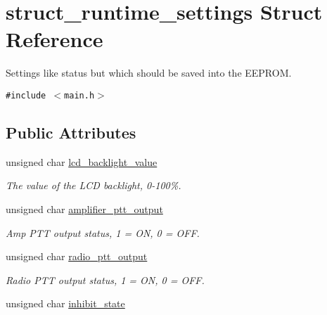 \hypertarget{structstruct__runtime__settings}{
\section{struct\_\-runtime\_\-settings Struct Reference}
\label{structstruct__runtime__settings}
}
Settings like status but which should be saved into the EEPROM.  


{\tt \#include $<$main.h$>$}

\subsection*{Public Attributes}
\begin{CompactItemize}
\item 
\hypertarget{structstruct__runtime__settings_502358dd4cc0cdf26581172177120edd}{
unsigned char \hyperlink{structstruct__runtime__settings_502358dd4cc0cdf26581172177120edd}{lcd\_\-backlight\_\-value}}
\label{structstruct__runtime__settings_502358dd4cc0cdf26581172177120edd}

\begin{CompactList}\small\item\em The value of the LCD backlight, 0-100\%. \item\end{CompactList}\item 
\hypertarget{structstruct__runtime__settings_83f784149e2898344213793aba172527}{
unsigned char \hyperlink{structstruct__runtime__settings_83f784149e2898344213793aba172527}{amplifier\_\-ptt\_\-output}}
\label{structstruct__runtime__settings_83f784149e2898344213793aba172527}

\begin{CompactList}\small\item\em Amp PTT output status, 1 = ON, 0 = OFF. \item\end{CompactList}\item 
\hypertarget{structstruct__runtime__settings_84a1acaf724a18b17a03628a0ccb8f1f}{
unsigned char \hyperlink{structstruct__runtime__settings_84a1acaf724a18b17a03628a0ccb8f1f}{radio\_\-ptt\_\-output}}
\label{structstruct__runtime__settings_84a1acaf724a18b17a03628a0ccb8f1f}

\begin{CompactList}\small\item\em Radio PTT output status, 1 = ON, 0 = OFF. \item\end{CompactList}\item 
\hypertarget{structstruct__runtime__settings_5d40926f3f9f8316048e3cfae44af575}{
unsigned char \hyperlink{structstruct__runtime__settings_5d40926f3f9f8316048e3cfae44af575}{inhibit\_\-state}}
\label{structstruct__runtime__settings_5d40926f3f9f8316048e3cfae44af575}


\end{CompactItemize}
